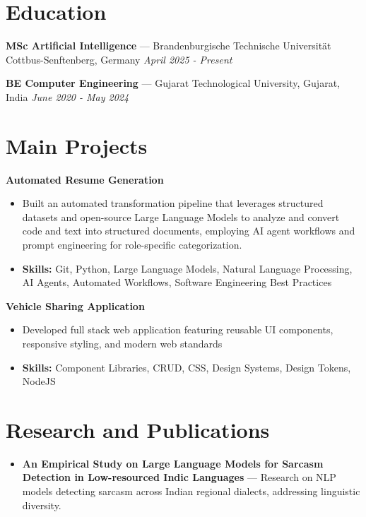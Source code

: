 \documentclass[a4paper,10pt]{article}
\begin{document}
\section*{Education}
\textbf{MSc Artificial Intelligence} — Brandenburgische Technische Universität Cottbus-Senftenberg, Germany \hfill \textit{April 2025 - Present}\par
\vspace{1.5pt}
\textbf{BE Computer Engineering} — Gujarat Technological University, Gujarat, India \hfill \textit{June 2020 - May 2024}\par

\section*{Main Projects}
\textbf{Automated Resume Generation}\par
\vspace{1pt}
\begin{itemize}
  \item Built an automated transformation pipeline that leverages structured datasets and open-source Large Language Models to analyze and convert code and text into structured documents, employing AI agent workflows and prompt engineering for role-specific categorization.
  \item \textbf{Skills:} Git, Python, Large Language Models, Natural Language Processing, AI Agents, Automated Workflows, Software Engineering Best Practices
\end{itemize}
\vspace{3pt}
\textbf{Vehicle Sharing Application}\par
\vspace{1pt}
\begin{itemize}
  \item Developed full stack web application featuring reusable UI components, responsive styling, and modern web standards
  \item \textbf{Skills:} Component Libraries, CRUD, CSS, Design Systems, Design Tokens, NodeJS
\end{itemize}

\section*{Research and Publications}
\begin{itemize}
\item \textbf{An Empirical Study on Large Language Models for Sarcasm Detection in Low-resourced Indic Languages} — Research on NLP models detecting sarcasm across Indian regional dialects, addressing linguistic diversity.
\end{itemize}
\end{document}
